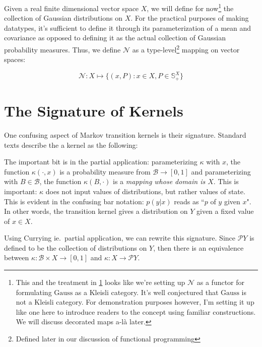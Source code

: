 \newcommand{\gaussian}{\mathcal{N}}
\newcommand{\gausscat}{\mathrm{Gauss}}
Given a real finite dimensional vector space $X$, we will define for now\footnote{This and the treatment in \ref{sec:kernel-signature} looks like we're setting up $\gaussian$ as a functor for formulating $\gausscat$ as a Kleisli category. It's well conjectured that $\gausscat$ is not a Kleisli category. For demonstration purposes however, I'm setting it up like one here to introduce readers to the concept using familiar constructions. We will discuss decorated maps a-l\`a \cite{stein2022extended} later.} the collection of Gaussian distributions on $X$.
For the practical purposes of making datatypes, it's sufficient to define it through its parameterization of a mean and covariance as opposed to defining it as the actual collection of Gaussian probability measures.
Thus, we define $\gaussian$ as a type-level\footnote{Defined later in our discussion of functional programming} mapping on vector spaces:

\newcommand{\symmetric}{\mathds{S}}
\begin{equation}
    \gaussian : X \mapsto \{(x,P) : x\in X, P \in \symmetric^X_+\}
\end{equation}

\section{The Signature of Kernels}
\label{sec:kernel-signature}

One confusing aspect of Markov transition kernels is their signature. 
Standard texts describe the a kernel as the following:


The important bit is in the partial application: parameterizing $\kappa$ with $x$, the function $\kappa(\cdot, x)$ is a probability measure from $\mathcal{B} \rightarrow [0,1]$ and parameterizing with $B\in \mathcal{B}$, the function $\kappa(B,\cdot)$ is a \emph{mapping whose domain is $X$}.
This is important: $\kappa$ does not input values of distributions, but rather values of state.
This is evident in the confusing bar notation: $p(y|x)$ reads as ``$p$ of $y$ given $x$".
In other words, the transition kernel gives a distribution on $Y$ given a fixed value of $x\in X$.

\newcommand{\giry}{\mathcal{P}}
Using Currying ie.\ partial application, we can rewrite this signature. 
Since $\giry Y$ is defined to be the collection of distributions on $Y$, then there is an equivalence between $\kappa : \mathcal{B} \times X \rightarrow [0,1]$ and $\kappa : X \rightarrow \giry Y$.

